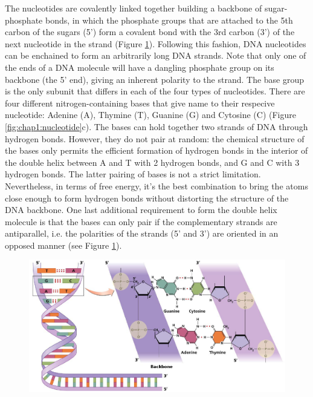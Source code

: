 The nucleotides are covalently linked together building a backbone
of sugar-phosphate bonds, in which the phosphate groups that are
attached to the 5th carbon of the sugars (5') form a covalent bond
with the 3rd carbon (3') of the next nucleotide in the strand (Figure
\ref{fig:chap1:dna_structure}). Following this fashion, DNA nucleotides can be enchained to form
an arbitrarily long DNA strands. Note that only one of the ends of a
DNA molecule will have a dangling phosphate group on its backbone (the 5' end),
giving an inherent polarity to the strand. The base group is the only
subunit that differs in each of the four types of nucleotides. There
are four different nitrogen-containing bases that give name to their
respecive nucleotide: Adenine (A), Thymine (T), Guanine (G) and
Cytosine (C) (Figure \ref{fig:chap1:nucleotide}c). The bases can hold together two strands of
DNA through hydrogen bonds. However, they do not pair at random: the
chemical structure of the bases only permits the efficient formation
of hydrogen bonds in the interior of the double helix between A and T
with 2 hydrogen bonds, and G and C with 3 hydrogen bonds. The latter 
pairing of bases is not a strict limitation. Nevertheless, in terms of
free energy, it's the best combination to bring the atoms close enough
to form hydrogen bonds without distorting the structure of the DNA
backbone. One last additional requirement to form the double helix
molecule is that the bases can only pair if the complementary strands
are antiparallel, i.e. the polarities of the strands (5' and 3') are
oriented in an opposed manner (see Figure
\ref{fig:chap1:dna_structure}).

\begin{figure}[h]
	\begin{minipage}[b]{\linewidth}
	  \centering
	  \includegraphics[width=\textwidth]{figures/chap1_dna_structure}
	  \caption{}
	  \label{fig:chap1:dna_structure}
   \end{minipage}
\end{figure}


